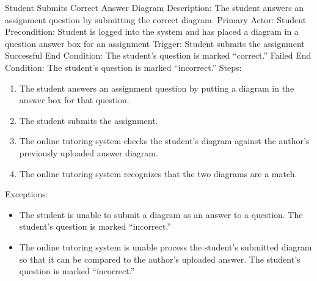     \begin{section}{Student Submits Correct Answer Diagram}
        Description: The student answers an assignment question by submitting the correct diagram. \newline
        Primary Actor: Student \newline
        Precondition: Student is logged into the system and has placed a diagram in a question answer box for an assignment \newline  
        Trigger: Student submits the assignment \newline
        Successful End Condition: The student’s question is marked “correct.” \newline
        Failed End Condition: The student’s question is marked “incorrect.” \newline
        \newline
        Steps:
        \begin{enumerate}
            \item{The student answers an assignment question by putting a diagram in the answer box for that question.}
            \item{The student submits the assignment.}
            \item{The online tutoring system checks the student’s diagram against the author’s previously uploaded answer diagram.}
            \item{The online tutoring system recognizes that the two diagrams are a match.}
        \end{enumerate}
        Exceptions:
        \begin{itemize}
            \item{The student is unable to submit a diagram as an answer to a question.  The student’s question is marked “incorrect.”}  
            \item{The online tutoring system is unable process the student’s submitted diagram so that it can be 
            compared to the author’s uploaded answer.  The student’s question is marked “incorrect.”}
        \end{itemize}
    \end{section}
    
